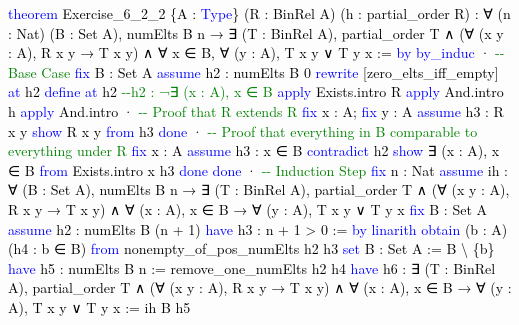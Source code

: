 \documentclass[
  letterpaper,
  DIV=11,
  numbers=noendperiod]{scrreprt}
\newenvironment{Shaded}{\begin{snugshade}}{\end{snugshade}}
\newcommand{\CommentTok}[1]{\textcolor[rgb]{0.37,0.37,0.37}{#1}}
\newcommand{\KeywordTok}[1]{\textcolor[rgb]{0.00,0.23,0.31}{#1}}
\newcommand{\NormalTok}[1]{\textcolor[rgb]{0.00,0.23,0.31}{#1}}
\renewcommand{\NormalTok}[1]{\textcolor[HTML]{000000}{#1}}
\renewcommand{\KeywordTok}[1]{\textcolor[HTML]{0000FF}{#1}}
\renewcommand{\CommentTok}[1]{\textcolor[HTML]{008000}{#1}}
\theoremstyle{remark}
\begin{document}
\begin{Shaded}
\begin{Highlighting}[]
\KeywordTok{theorem}\NormalTok{ Exercise\_6\_2\_2 \{A : }\KeywordTok{Type}\NormalTok{\} (R : BinRel A) (h : partial\_order R) :}
\NormalTok{    ∀ (n : Nat) (B : Set A), numElts B n → ∃ (T : BinRel A),}
\NormalTok{    partial\_order T ∧ (∀ (x y : A), R x y → T x y) ∧}
\NormalTok{    ∀ x ∈ B, ∀ (y : A), T x y ∨ T y x := }\KeywordTok{by}
  \KeywordTok{by\_induc}
\NormalTok{  · }\CommentTok{{-}{-} Base Case}
    \KeywordTok{fix}\NormalTok{ B : Set A}
    \KeywordTok{assume}\NormalTok{ h2 : numElts B 0}
    \KeywordTok{rewrite}\NormalTok{ [zero\_elts\_iff\_empty] }\KeywordTok{at}\NormalTok{ h2}
    \KeywordTok{define} \KeywordTok{at}\NormalTok{ h2     }\CommentTok{{-}{-}h2 : ¬∃ (x : A), x ∈ B}
    \KeywordTok{apply}\NormalTok{ Exists.intro R}
    \KeywordTok{apply}\NormalTok{ And.intro h}
    \KeywordTok{apply}\NormalTok{ And.intro}
\NormalTok{    · }\CommentTok{{-}{-} Proof that R extends R}
      \KeywordTok{fix}\NormalTok{ x : A; }\KeywordTok{fix}\NormalTok{ y : A}
      \KeywordTok{assume}\NormalTok{ h3 : R x y}
      \KeywordTok{show}\NormalTok{ R x y }\KeywordTok{from}\NormalTok{ h3}
      \KeywordTok{done}
\NormalTok{    · }\CommentTok{{-}{-} Proof that everything in B comparable to everything under R}
      \KeywordTok{fix}\NormalTok{ x : A}
      \KeywordTok{assume}\NormalTok{ h3 : x ∈ B}
      \KeywordTok{contradict}\NormalTok{ h2}
      \KeywordTok{show}\NormalTok{ ∃ (x : A), x ∈ B }\KeywordTok{from}\NormalTok{ Exists.intro x h3}
      \KeywordTok{done}
    \KeywordTok{done}
\NormalTok{  · }\CommentTok{{-}{-} Induction Step}
    \KeywordTok{fix}\NormalTok{ n : Nat}
    \KeywordTok{assume}\NormalTok{ ih : ∀ (B : Set A), numElts B n → ∃ (T : BinRel A),}
\NormalTok{      partial\_order T ∧ (∀ (x y : A), R x y → T x y) ∧}
\NormalTok{      ∀ (x : A), x ∈ B → ∀ (y : A), T x y ∨ T y x}
    \KeywordTok{fix}\NormalTok{ B : Set A}
    \KeywordTok{assume}\NormalTok{ h2 : numElts B (n + 1)}
    \KeywordTok{have}\NormalTok{ h3 : n + 1 \textgreater{} 0 := }\KeywordTok{by} \KeywordTok{linarith}
    \KeywordTok{obtain}\NormalTok{ (b : A) (h4 : b ∈ B) }\KeywordTok{from}\NormalTok{ nonempty\_of\_pos\_numElts h2 h3}
    \KeywordTok{set}\NormalTok{ B\textquotesingle{} : Set A := B \textbackslash{} \{b\}}
    \KeywordTok{have}\NormalTok{ h5 : numElts B\textquotesingle{} n := remove\_one\_numElts h2 h4}
    \KeywordTok{have}\NormalTok{ h6 : ∃ (T : BinRel A), partial\_order T ∧}
\NormalTok{      (∀ (x y : A), R x y → T x y) ∧}
\NormalTok{      ∀ (x : A), x ∈ B\textquotesingle{} → ∀ (y : A), T x y ∨ T y x := ih B\textquotesingle{} h5}

\end{Highlighting}
\end{Shaded}
\end{document}
